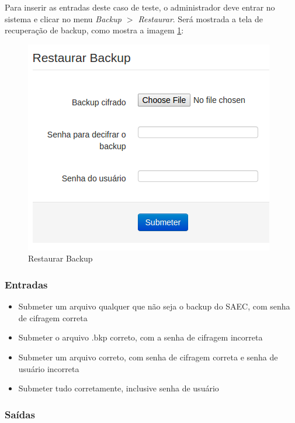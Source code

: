 Para inserir as entradas deste caso de teste, o administrador deve entrar no sistema e clicar no menu \textit{Backup $>$ Restaurar}. Será mostrada a tela de recuperação de backup, como mostra a imagem \ref{fig:restaurarbackup}:

\begin{figure}[ht]
     \centering
     \includegraphics[scale=0.6]{images/restaurarbackup.png}
     \caption{Restaurar Backup}
     \label{fig:restaurarbackup}
\end{figure}

\subsubsection{Entradas}
\begin{itemize}

	\item Submeter um arquivo qualquer que não seja o backup do SAEC, com senha de cifragem correta
	\item Submeter o arquivo .bkp correto, com a senha de cifragem incorreta
	\item Submeter um arquivo correto, com senha de cifragem correta e senha de usuário incorreta
	\item Submeter tudo corretamente, inclusive senha de usuário
	
\end{itemize}

\subsubsection{Saídas}

